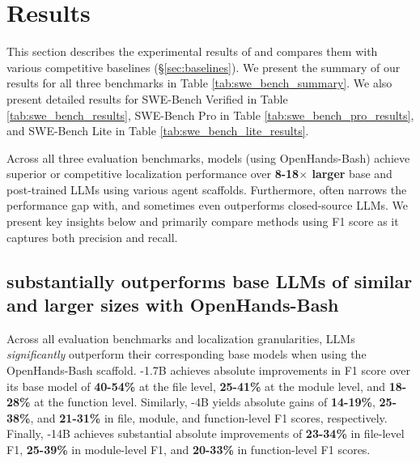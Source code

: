 

\section{Results}\label{sec:results}

This section describes the experimental results of \methodname and compares them with various competitive baselines (\S\ref{sec:baselines}). We present the summary of our results for all three benchmarks in Table \ref{tab:swe_bench_summary}. We also present detailed results for SWE-Bench Verified in Table \ref{tab:swe_bench_results}, SWE-Bench Pro in Table \ref{tab:swe_bench_pro_results}, and SWE-Bench Lite in Table \ref{tab:swe_bench_lite_results}. 

Across all three evaluation benchmarks, \methodname models (using OpenHands-Bash) achieve superior or competitive localization performance over \textbf{8-18$\times$ larger} base and post-trained LLMs using various agent scaffolds. Furthermore, \methodname often narrows the performance gap with, and sometimes even outperforms closed-source LLMs. We present key insights below and primarily compare methods using F1 score as it captures both precision and recall.

\subsection{\methodname substantially outperforms base LLMs of similar and larger sizes with OpenHands-Bash}
Across all evaluation benchmarks and localization granularities, \methodname LLMs \emph{significantly} outperform their corresponding base models when using the OpenHands-Bash scaffold. \methodname-1.7B achieves absolute improvements in F1 score over its base model of \textbf{40-54\%} at the file level, \textbf{25-41\%} at the module level, and \textbf{18-28\%} at the function level. Similarly, \methodname-4B yields absolute gains of \textbf{14-19\%}, \textbf{25-38\%}, and \textbf{21-31\%} in file, module, and function-level F1 scores, respectively. Finally, \methodname-14B achieves substantial absolute improvements of \textbf{23-34\%} in file-level F1, \textbf{25-39\%} in module-level F1, and \textbf{20-33\%} in function-level F1 scores.

